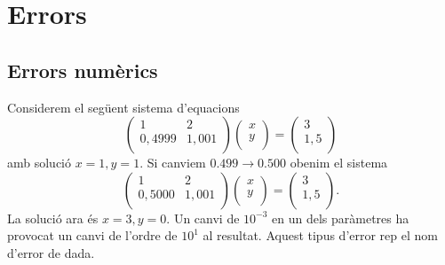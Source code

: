 \chapter{Errors}

\section{Errors numèrics}
	
\begin{example}\label{ej:1_errores}
   Considerem el següent sistema d'equacions
    \[
        \begin{pmatrix}
            1 & 2\\
            0,4999 & 1,001\\
        \end{pmatrix}
        \begin{pmatrix}
        x\\
        y\\
        \end{pmatrix} =
        \begin{pmatrix}
        3\\
        1,5\\
        \end{pmatrix}
    \]
    amb solució $x = 1, y = 1$. Si canviem $0.499 \rightarrow 0.500$ obenim el sistema
    \[
        \begin{pmatrix}
            1 & 2\\
            0,5000 & 1,001\\
        \end{pmatrix}
        \begin{pmatrix}
        x\\
        y\\
        \end{pmatrix} =
        \begin{pmatrix}
        3\\
        1,5\\
        \end{pmatrix}.
    \]
    La solució ara és $x = 3, y = 0$. Un canvi de  $10^{-3}$ en un dels paràmetres ha provocat un canvi de l'ordre de $10^1$ al resultat. Aquest tipus d'error rep el nom d'error de dada.
\end{example}

